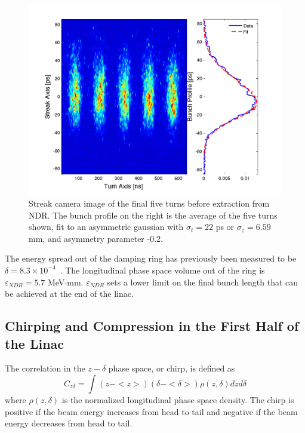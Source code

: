 \documentclass[%
twocolumn,
showpacs,preprintnumbers,
 aps,
prstab,
]{revtex4-1}
\begin{document}
\begin{figure}[htb]
  \includegraphics[width=\columnwidth]{figures/combo.pdf}
  \caption{Streak camera image of the final five turns before extraction from NDR. The bunch profile on the right is the average of the five turns shown, fit to an asymmetric gaussian with $\sigma_t = 22$ ps or $\sigma_z = 6.59$ mm, and asymmetry parameter -0.2.}
  \label{streak}
\end{figure}

The energy spread out of the damping ring has previously been measured to be $\delta = 8.3 \times 10^{-4}$~\cite{holtz_ring}. The longitudinal phase space volume out of the ring is $\varepsilon_{NDR} = 5.7$ MeV$\cdot$mm. $\varepsilon_{NDR}$ sets a lower limit on the final bunch length that can be achieved at the end of the linac.

\subsection{Chirping and Compression in the First Half of the Linac}\label{first}

The correlation in the $z-\delta$ phase space, or chirp, is defined as
\begin{equation}
C_{z\delta} = \int (z-<z>)(\delta - <\delta>)\rho(z,\delta)dzd\delta
\end{equation}
where $\rho(z,\delta)$ is the normalized longitudinal phase space density. The chirp is positive if the beam energy increases from head to tail and negative if the beam energy decreases from head to tail. 
\end{document}
